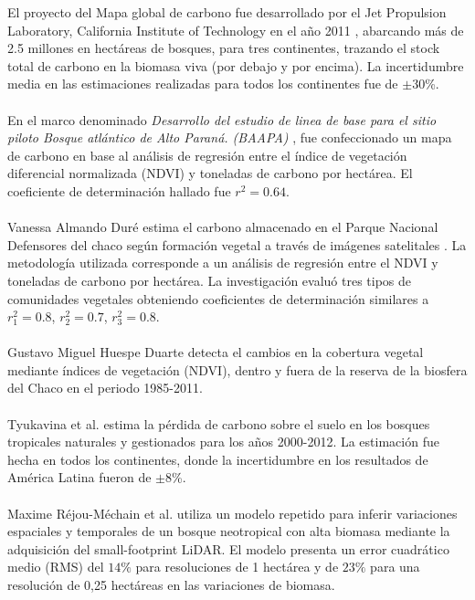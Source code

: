 El proyecto del Mapa global de carbono fue desarrollado por el Jet Propulsion Laboratory, California Institute of Technology en el a\~{n}o 2011 \cite{saatchi2011benchmark}, abarcando m\'as de 2.5 millones en hect\'areas de bosques, para tres continentes, trazando el stock total de carbono en la biomasa viva (por debajo y por encima). La incertidumbre media en las estimaciones realizadas para todos los continentes fue de $ \pm 30$\%.\\~\\
En el marco denominado \textit{Desarrollo del estudio de linea de base para el sitio piloto Bosque atl\'antico de Alto Paran\'a. (BAAPA)} \cite{BAAPA2013}, fue confeccionado un mapa de carbono en base al an\'alisis de regresi\'on entre el \'indice de vegetaci\'on diferencial normalizada (NDVI) y toneladas de carbono por hect\'area. El coeficiente de determinaci\'on hallado fue $ r^{2}=0.64 $.\\~\\
 Vanessa Almando Dur\'e \cite{kris2014estimacion} estima el carbono almacenado en el Parque Nacional Defensores del chaco seg\'un formaci\'on vegetal a trav\'es de im\'agenes satelitales . La metodolog\'ia utilizada corresponde a un an\'alisis de regresi\'on entre el NDVI y toneladas de carbono por hect\'area. La investigaci\'on evalu\'o tres tipos de comunidades vegetales obteniendo coeficientes de determinaci\'on similares a $ r_{1}^{2}=0.8$, $ r_{2}^{2}=0.7 $, $r_{3}^{2}=0.8 $.\\~\\
 Gustavo Miguel Huespe Duarte \cite{gustavo2012deteccion} detecta el cambios en la cobertura vegetal mediante \'indices de vegetaci\'on (NDVI), dentro y fuera de la reserva de la biosfera del Chaco en el periodo 1985-2011.\\~\\
Tyukavina et al. \cite{tyukavina2015aboveground} estima la p\'erdida de carbono sobre el suelo en los bosques tropicales naturales y gestionados para los a\~{n}os 2000-2012. La estimaci\'on fue hecha en todos los continentes, donde la incertidumbre en los resultados de Am\'erica Latina fueron de $ \pm 8 $\%.\\~\\
Maxime R\'ejou-M\'echain et al. \cite{rejou2015using} utiliza un modelo repetido para inferir variaciones espaciales y temporales de un bosque neotropical con alta biomasa mediante la adquisici\'on del small-footprint LiDAR. El modelo presenta un error cuadr\'atico medio (RMS) del $ 14\% $ para resoluciones de 1 hect\'area y de $ 23\% $ para una resoluci\'on de 0,25 hect\'areas en las variaciones de biomasa.\\~\\
